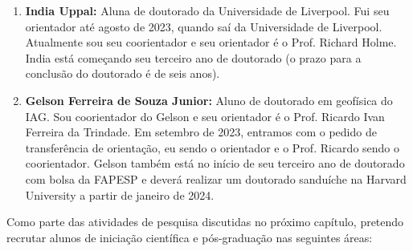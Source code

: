 \documentclass[12pt,a4paper,oneside]{book}
\begin{document}
\begin{enumerate}
  \item \textbf{India Uppal:} Aluna de doutorado da Universidade de Liverpool.
    Fui seu orientador até agosto de 2023, quando saí da Universidade de
    Liverpool. Atualmente sou seu coorientador e seu orientador é o Prof.
    Richard Holme. India está começando seu terceiro ano de doutorado (o prazo
    para a conclusão do doutorado é de seis anos).
  \item \textbf{Gelson Ferreira de Souza Junior:} Aluno de doutorado em
    geofísica do IAG. Sou coorientador do Gelson e seu orientador é o Prof.
    Ricardo Ivan Ferreira da Trindade. Em setembro de 2023, entramos com o
    pedido de transferência de orientação, eu sendo o orientador e o Prof.
    Ricardo sendo o coorientador. Gelson também está no
    início de seu terceiro ano de doutorado com bolsa da FAPESP e deverá
    realizar um doutorado sanduíche na Harvard University a partir de
    janeiro de 2024.
\end{enumerate}

Como parte das atividades de pesquisa discutidas no próximo capítulo, pretendo
recrutar alunos de iniciação científica e pós-graduação nas seguintes áreas:
\end{document}
